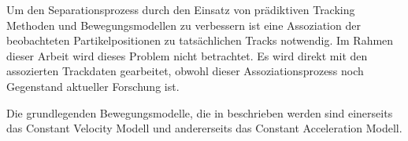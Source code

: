 Um den Separationsprozess durch den Einsatz von prädiktiven Tracking Methoden und Bewegungsmodellen zu verbessern ist eine Assoziation 
der beobachteten Partikelpositionen zu tatsächlichen Tracks notwendig. 
Im Rahmen dieser Arbeit wird dieses Problem nicht betrachtet. 
Es wird direkt mit den assozierten Trackdaten gearbeitet, 
obwohl dieser Assoziationsprozess noch Gegenstand aktueller Forschung ist.

Die grundlegenden Bewegungsmodelle, die in \cite{Pfaff2018} beschrieben werden sind 
einerseits das Constant Velocity Modell und andererseits das Constant Acceleration Modell.


